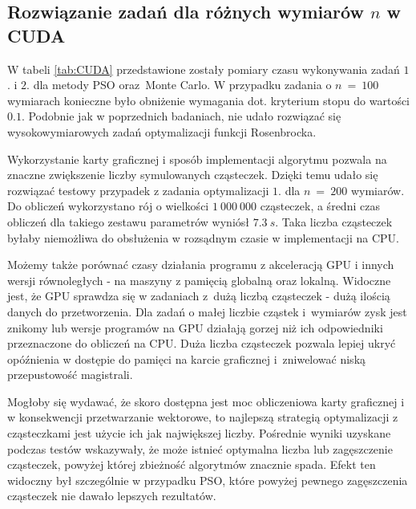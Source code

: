 \documentclass[11pt, a4paper, oneside]{article}
\begin{document}
\subsection{Rozwiązanie zadań dla różnych wymiarów $n$ w CUDA} \label{sec:table:cuda}
W tabeli \ref{tab:CUDA} przedstawione zostały pomiary czasu wykonywania zadań $1$. i $2$. dla metody PSO oraz~Monte Carlo. W przypadku zadania o $n \ = \ 100$ wymiarach konieczne było obniżenie wymagania dot. kryterium stopu do wartości $0.1$. Podobnie jak w poprzednich badaniach, nie udało rozwiązać się wysokowymiarowych zadań optymalizacji funkcji Rosenbrocka.

Wykorzystanie karty graficznej i sposób implementacji algorytmu pozwala na znaczne zwiększenie liczby symulowanych cząsteczek. Dzięki temu udało się rozwiązać testowy przypadek z zadania optymalizacji $1.$ dla $n \ = \ 200$ wymiarów. Do obliczeń wykorzystano rój o wielkości $1 \ 000 \ 000$ cząsteczek, a średni czas obliczeń dla takiego zestawu parametrów wyniósł $7.3 \ s$. Taka liczba cząsteczek byłaby niemożliwa do obsłużenia w rozsądnym czasie w implementacji na CPU.

Możemy także porównać czasy działania programu z akceleracją GPU i innych wersji równoległych - na maszyny z pamięcią globalną oraz lokalną. Widoczne jest, że GPU sprawdza się w zadaniach z~dużą liczbą cząsteczek - dużą ilością danych do przetworzenia. Dla zadań o małej liczbie cząstek i~wymiarów zysk jest znikomy lub wersje programów na GPU działają gorzej niż ich odpowiedniki przeznaczone do obliczeń na CPU. Duża liczba cząsteczek pozwala lepiej ukryć opóźnienia w dostępie do pamięci na karcie graficznej i~zniwelować niską przepustowość magistrali.

Mogłoby się wydawać, że skoro dostępna jest moc obliczeniowa karty graficznej i w konsekwencji przetwarzanie wektorowe, to najlepszą strategią optymalizacji z cząsteczkami jest użycie ich jak największej liczby. Pośrednie wyniki uzyskane podczas testów wskazywały, że może istnieć optymalna liczba lub zagęszczenie cząsteczek, powyżej której zbieżność algorytmów znacznie spada. Efekt ten widoczny był szczególnie w przypadku PSO, które powyżej pewnego zagęszczenia cząsteczek nie dawało lepszych rezultatów.
\end{document}
